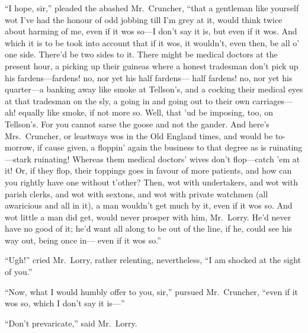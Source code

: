 ``I hope, sir,'' pleaded the abashed Mr.\ Cruncher, ``that a gentleman
like yourself wot I've had the honour of odd jobbing till I'm grey at
it, would think twice about harming of me, even if it wos so---I don't
say it is, but even if it wos.  And which it is to be took into
account that if it wos, it wouldn't, even then, be all o' one side.
There'd be two sides to it. There might be medical doctors at the
present hour, a picking up their guineas where a honest tradesman
don't pick up his fardens---fardens! no, nor yet his half fardens---%
half fardens! no, nor yet his quarter---a banking away like smoke at
Tellson's, and a cocking their medical eyes at that tradesman on the
sly, a going in and going out to their own carriages---ah! equally
like smoke, if not more so.  Well, that 'ud be imposing, too, on
Tellson's.  For you cannot sarse the goose and not the gander.
And here's Mrs.\ Cruncher, or leastways wos in the Old England times,
and would be to-morrow, if cause given, a floppin' again the business
to that degree as is ruinating---stark ruinating!  Whereas them medical
doctors' wives don't flop---catch 'em at it!  Or, if they flop, their
toppings goes in favour of more patients, and how can you rightly
have one without t'other?  Then, wot with undertakers, and wot with
parish clerks, and wot with sextons, and wot with private watchmen
(all awaricious and all in it), a man wouldn't get much by it, even
if it wos so.  And wot little a man did get, would never prosper with
him, Mr.\ Lorry.  He'd never have no good of it; he'd want all along
to be out of the line, if he, could see his way out, being once in---%
even if it wos so.''

``Ugh!'' cried Mr.\ Lorry, rather relenting, nevertheless, ``I am shocked
at the sight of you.''

``Now, what I would humbly offer to you, sir,'' pursued Mr.\ Cruncher,
``even if it wos so, which I don't say it is---''

``Don't prevaricate,'' said Mr.\ Lorry.


